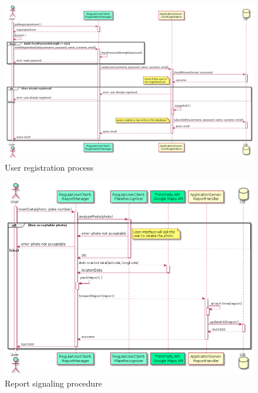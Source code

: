 \medskip

\begin{figure}[H]
	\centering
	\includegraphics[width=\textwidth]{Images/seqDiag_userReg}
	\caption{User registration process}
\end{figure}
	\newpage

\begin{figure}[H]
	\centering
	\includegraphics[width=\textwidth]{Images/seqDiag_ReportSignal}
	\caption{Report signaling procedure}
\end{figure}
	\newpage	
	
